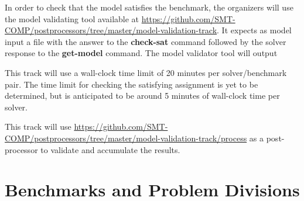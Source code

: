 \documentclass[12pt]{article}
\newcommand{\akey}[1]{\textbf{#1}\xspace}
\begin{document}
In order to check that the model satisfies the benchmark, the organizers will
use the model validating tool available at
{\url{https://github.com/SMT-COMP/postprocessors/tree/master/model-validation-track}}.
It expects as model input a file with the answer to the \akey{check-sat}
command followed by the solver response to the \akey{get-model} command.
The model validator tool will output 

This track will use a wall-clock time limit of 20 minutes per solver/benchmark
pair. The time limit for checking the satisfying assignment is yet to be
determined, but is anticipated to be around 5 minutes of wall-clock time per
solver.

This track will use
{\url{https://github.com/SMT-COMP/postprocessors/tree/master/model-validation-track/process}}
as a post-processor
to validate and accumulate the results.


\section{Benchmarks and Problem Divisions}
\end{document}
